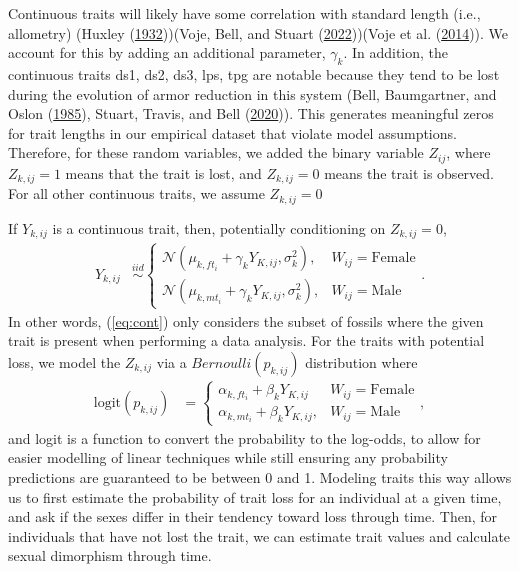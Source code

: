 \documentclass[
  12pt,
]{article}
\begin{document}
Continuous traits will likely have some correlation with standard length
(i.e., allometry) (Huxley
(\protect\hyperlink{ref-Huxley1932}{1932}))(Voje, Bell, and Stuart
(\protect\hyperlink{ref-Vojeetal2022}{2022}))(Voje et al.
(\protect\hyperlink{ref-Vojeetal2014}{2014})). We account for this by
adding an additional parameter, \(\gamma_k\). In addition, the
continuous traits ds1, ds2, ds3, lps, tpg are notable because they tend
to be lost during the evolution of armor reduction in this system (Bell,
Baumgartner, and Oslon (\protect\hyperlink{ref-Belletal1985}{1985}),
Stuart, Travis, and Bell
(\protect\hyperlink{ref-Stuartetal2020}{2020})). This generates
meaningful zeros for trait lengths in our empirical dataset that violate
model assumptions. Therefore, for these random variables, we added the
binary variable \(Z_{ij}\), where \(Z_{k,ij} = 1\) means that the trait
is lost, and \(Z_{k,ij} = 0\) means the trait is observed. For all other
continuous traits, we assume \(Z_{k,ij} = 0\)

If \(Y_{k,ij}\) is a continuous trait, then, potentially conditioning on
\(Z_{k,ij} = 0\), \begin{align}
{Y}_{k,ij} & \overset{iid}{\sim}\left\{\begin{array}{llll} \mathcal{N}(\mu_{k,ft_i} + \gamma_kY_{K,ij},\sigma_k^2), & W_{ij} = \text{Female} \\ \mathcal{N}(\mu_{k,mt_i} + \gamma_kY_{K,ij},\sigma_k^2), & W_{ij} = \text{Male} \end{array}\right..
\label{eq:cont}
\end{align} In other words, (\ref{eq:cont}) only considers the subset of
fossils where the given trait is present when performing a data
analysis. For the traits with potential loss, we model the \(Z_{k,ij}\)
via a \(Bernoulli(p_{k,ij})\) distribution where \begin{align}
\text{logit}({p}_{k,ij}) & = \left\{\begin{array}{llll} \alpha_{k,ft_i} + \beta_kY_{K,ij} & W_{ij} = \text{Female} \\ \alpha_{k,mt_i} + \beta_kY_{K,ij}, & W_{ij} = \text{Male} \end{array}\right.,
\label{eq:cont_prob}
\end{align} and logit is a function to convert the probability to the
log-odds, to allow for easier modelling of linear techniques while still
ensuring any probability predictions are guaranteed to be between 0 and
1. Modeling traits this way allows us to first estimate the probability
of trait loss for an individual at a given time, and ask if the sexes
differ in their tendency toward loss through time. Then, for individuals
that have not lost the trait, we can estimate trait values and calculate
sexual dimorphism through time.
\end{document}
